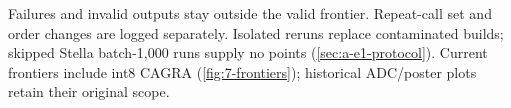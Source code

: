Failures and invalid outputs stay outside the valid frontier. Repeat-call set and order changes are logged separately. Isolated reruns replace contaminated builds; skipped Stella batch-1,000 runs supply no points (\cref{sec:a-e1-protocol}). Current frontiers include int8 CAGRA (\cref{fig:7-frontiers}); historical ADC/poster plots retain their original scope.